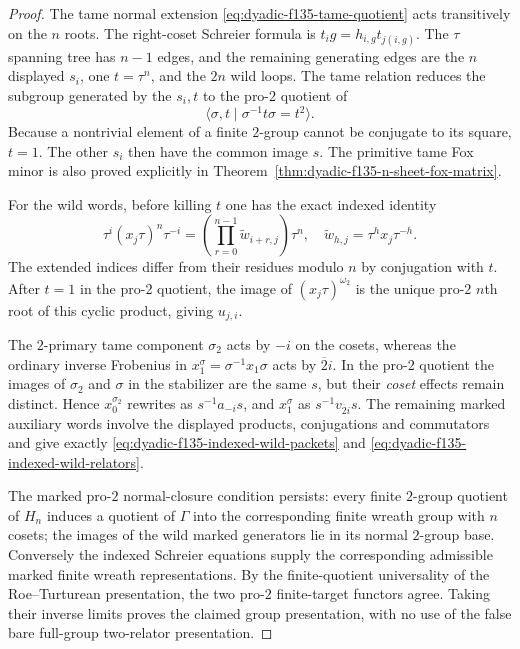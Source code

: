 \begin{proof}
The tame normal extension
\eqref{eq:dyadic-f135-tame-quotient}
acts transitively on the $n$ roots.
The right-coset Schreier formula is
$t_i g=h_{i,g}t_{j(i,g)}$.
The $\tau$ spanning tree has $n-1$
edges, and the remaining generating
edges are the $n$ displayed $s_i$,
one $t=\tau^n$, and the $2n$ wild loops.
The tame relation reduces the
subgroup generated by the $s_i,t$
to the pro-$2$ quotient of
\[
\langle \sigma,t\mid
\sigma^{-1}t\sigma=t^2\rangle .
\]
Because a nontrivial element of
a finite $2$-group cannot be
conjugate to its square,
$t=1$.  The other $s_i$ then
have the common image $s$.
The primitive tame Fox minor
is also proved explicitly in
Theorem~\ref{thm:dyadic-f135-n-sheet-fox-matrix}.

For the wild words, before killing $t$
one has the exact indexed identity
\[
\tau^i(x_j\tau)^n\tau^{-i}
=\left(\prod_{r=0}^{n-1}
\widetilde w_{i+r,j}\right)\tau^n,
\quad
\widetilde w_{h,j}=
\tau^h x_j\tau^{-h}.
\]
The extended indices differ from
their residues modulo $n$ by
conjugation with $t$.
After $t=1$ in the pro-$2$ quotient,
the image of
$(x_j\tau)^{\omega_2}$
is the unique pro-$2$ $n$th
root of this cyclic product,
giving $u_{j,i}$.

The $2$-primary tame component
$\sigma_2$ acts by $-i$ on
the cosets, whereas the
ordinary inverse Frobenius
in $x_1^\sigma=\sigma^{-1}x_1\sigma$
acts by $\overline2i$.
In the pro-$2$ quotient
the images of $\sigma_2$ and
$\sigma$ in the stabilizer
are the same $s$,
but their \emph{coset}
effects remain distinct.
Hence $x_0^{\sigma_2}$
rewrites as $s^{-1}a_{-i}s$,
and $x_1^\sigma$ as
$s^{-1}v_{\overline2i}s$.
The remaining marked auxiliary
words involve the displayed
products, conjugations and
commutators and give exactly
\eqref{eq:dyadic-f135-indexed-wild-packets}
and
\eqref{eq:dyadic-f135-indexed-wild-relators}.

The marked pro-$2$ normal-closure
condition persists: every finite
$2$-group quotient of $H_n$
induces a quotient of $\Gamma$
into the corresponding finite
wreath group with $n$ cosets;
the images of the wild marked
generators lie in its normal
$2$-group base.
Conversely the indexed
Schreier equations supply the
corresponding admissible marked
finite wreath representations.
By the finite-quotient
universality of the
Roe--Turturean presentation,
the two pro-$2$ finite-target
functors agree.
Taking their inverse limits
proves the claimed group
presentation, with no use
of the false bare
full-group two-relator
presentation.
\end{proof}

